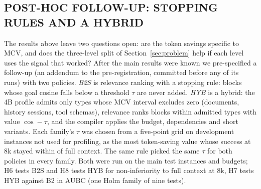 \subsection{POST-HOC FOLLOW-UP: STOPPING RULES AND A HYBRID}
The results above leave two questions open: are the token savings specific to MCV, and does the three-level split of
Section~\ref{sec:problem} help if each level uses the signal that worked? After the main results were known we
pre-specified a follow-up (an addendum to the pre-registration, committed before any of its runs) with two policies.
\emph{B2S} is relevance ranking with a stopping rule: blocks whose goal cosine falls below a threshold $\tau$ are never
added. \emph{HYB} is a hybrid: the 4B profile admits only types whose MCV interval excludes zero (documents, history
sessions, tool schemas), relevance ranks blocks within admitted types with value $\cos-\tau$, and the compiler applies the
budget, dependencies and short variants. Each family's $\tau$ was chosen from a five-point grid on \RNCalib development
instances not used for profiling, as the most token-saving value whose success at 8k stayed within \RMargin of full
context. The same rule picked the same $\tau$ for both policies in every family. Both were run on the main test instances
and budgets; H6 tests B2S and H8 tests HYB for non-inferiority to full context at 8k, H7 tests HYB against B2 in AUBC
(one Holm family of nine tests).

